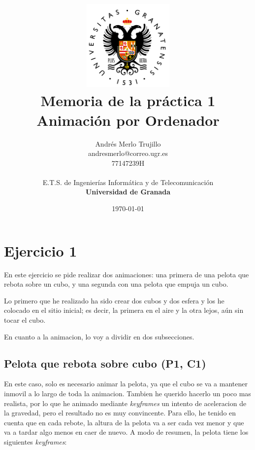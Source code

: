 \documentclass{article}
\title{
\includegraphics[width=1.75in]{imagenes/UGR-Logo.png} \\
\vspace*{1in}
\textbf{Memoria de la práctica 1} \\
Animación por Ordenador \\
\vspace*{0.5in}}
\author{Andrés Merlo Trujillo \\
andresmerlo@correo.ugr.es \\
77147239H \\ 
\vspace*{0.5in} \\
E.T.S. de Ingenierías Informática y de Telecomunicación \\
\textbf{Universidad de Granada}} \date{\today}
\begin{document}
\begin{titlingpage}
\maketitle
\end{titlingpage}

\tableofcontents

\newpage

\pagestyle{fancy}   %

\section{Ejercicio 1}

En este ejercicio se pide realizar dos animaciones: una primera de una pelota que rebota sobre un cubo, y una segunda con una pelota que empuja un cubo.

\bigskip


Lo primero que he realizado ha sido crear dos cubos y dos esfera y los he colocado en el sitio inicial; es decir, la primera en el aire y la otra lejos, aún sin tocar el cubo.




En cuanto a la animacion, lo voy a dividir en dos subsecciones.

\subsection{Pelota que rebota sobre cubo (P1, C1)}

En este caso, solo es necesario animar la pelota, ya que el cubo se va a mantener inmovil a lo largo de toda la animacion. Tambien he querido hacerlo un poco mas realista, por lo que he animado mediante \textit{keyframes} un intento de aceleracion de la gravedad, pero el resultado no es muy convincente. Para ello, he tenido en cuenta que en cada rebote, la altura de la pelota va a ser cada vez menor y que va a tardar algo menos en caer de nuevo. A modo de resumen, la pelota tiene los siguientes \textit{keyframes}:
\end{document}
